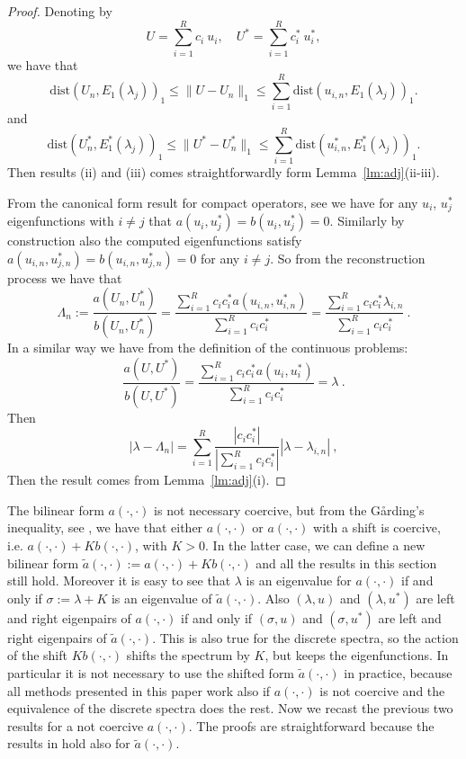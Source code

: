 \documentclass[preprint,12pt]{elsarticle}
\begin{document}
\begin{proof}
Denoting by 
$$
U=\sum_{i=1}^{R} c_i \ u_{i},\quad U^*=\sum_{i=1}^{R} c_i^* \ u_{i}^*,
$$
we have that
$$
\mathrm{dist}(
U_n,E_1(\lambda_j))_{1}\leq \|U-U_n\|_{1}\leq \sum_{i=1}^{R} \mathrm{dist}(
u_{i,n},E_1(\lambda_j))_{1}.
$$
and
$$
\mathrm{dist}(
U_n^*,E_1^*(\lambda_j))_{1}\leq \|U^*-U_n^*\|_{1}\leq \sum_{i=1}^{R} \mathrm{dist}(
u_{i,n}^*,E_1^*(\lambda_j))_{1}.
$$
Then results (ii) and (iii) comes straightforwardly form Lemma~\ref{lm:adj}(ii-iii).


From the canonical form result for compact operators, see \cite[Theorem~9.17]{Hislop} we have for any $u_i$, $u_j^*$ eigenfunctions with $i\neq j$ that $a(u_i,u_j^*)=b(u_i,u_j^*)=0$.
Similarly by construction also the computed eigenfunctions satisfy $a(u_{i,n},u_{j,n}^*)=b(u_{i,n},u_{j,n}^*)=0$ for any $i\neq j$.
So from the reconstruction process we have that
$$
\Lambda_n:=\frac{a(U_n,U_n^*)}{b(U_n,U_n^*)}=\frac{\sum_{i=1}^{R} c_ic_i^*a(u_{i,n},u_{i,n}^*)}{\sum_{i=1}^{R} c_ic_i^*}
=\frac{\sum_{i=1}^{R} c_ic_i^*\lambda_{i,n}}{\sum_{i=1}^{R} c_ic_i^*}\ .
$$
In a similar way we have from the definition of the continuous problems:
$$
\frac{a(U,U^*)}{b(U,U^*)}=\frac{\sum_{i=1}^{R} c_ic_i^*a(u_{i},u_{i}^*)}{\sum_{i=1}^{R} c_ic_i^*}=\lambda\ .
$$
Then
$$
|\lambda-\Lambda_n|=\sum_{i=1}^{R}\frac{|c_ic_i^*|}{|\sum_{i=1}^{R} c_ic_i^*|}|\lambda-\lambda_{i,n}| \ ,
$$
Then the result comes from Lemma~\ref{lm:adj}(i).



\end{proof}

The bilinear form $a(\cdot,\cdot)$ is not necessary coercive, but from the G\r{a}rding's inequality, see \cite[Theorem~(5.6.8)]{Brenner}, we have that either $a(\cdot,\cdot)$ or $a(\cdot,\cdot)$ with a shift is coercive, i.e. $a(\cdot,\cdot)+K b(\cdot,\cdot)$, with $K>0$. In the latter case, we can define a new bilinear form $\tilde a(\cdot,\cdot):=a(\cdot,\cdot)+K b(\cdot,\cdot)$ and all the results in this section still hold. Moreover it is easy to see that $\lambda$ is an eigenvalue for $a(\cdot,\cdot)$ if and only if $\sigma:=\lambda+K$ is an eigenvalue of $\tilde  a(\cdot,\cdot)$. Also $(\lambda,u)$ and $(\lambda,u^*)$ are left and right eigenpairs of $a(\cdot,\cdot)$ if and only if $(\sigma,u)$ and $(\sigma,u^*)$ are left and right eigenpairs of $\tilde  a(\cdot,\cdot)$. This is also true for the discrete spectra, so the action of the shift $K b(\cdot,\cdot)$ shifts the spectrum by $K$, but keeps the eigenfunctions. In particular it is not necessary to use the shifted form $\tilde a(\cdot,\cdot)$ in practice, because all methods presented in this paper work also if $a(\cdot,\cdot)$ is not coercive and the equivalence of the discrete spectra does the rest. Now we recast the previous two results for a not coercive  $a(\cdot,\cdot)$. The proofs are straightforward because the results in \cite{babuska} hold also for $\tilde a(\cdot,\cdot)$.
\end{document}
